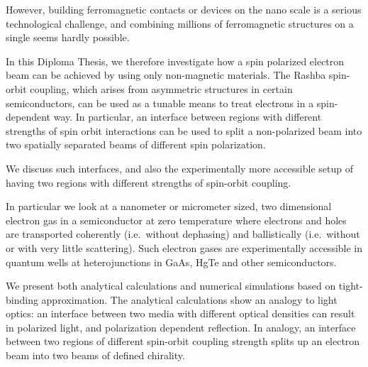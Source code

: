 However, building ferromagnetic contacts or devices on
the nano scale is a serious technological challenge, and combining millions of
ferromagnetic structures on a single seems hardly possible.

In this Diploma Thesis, we therefore investigate how a spin polarized electron
beam can be achieved by using only non-magnetic materials. The Rashba 
spin-orbit coupling, which arises from
asymmetric structures in certain semiconductors, can be used as a tunable
means to treat
electrons in a spin-dependent way. In particular, an interface
between regions with different strengths of spin orbit interactions can be
used to split a non-polarized beam into two spatially separated beams of
different spin polarization.

We discuss such interfaces, and also the experimentally more accessible setup
of having two regions with different strengths of spin-orbit coupling.

In particular we look at a nanometer or micrometer sized, two dimensional
electron gas in a semiconductor at zero temperature where electrons and holes
are transported coherently (i.e.~without dephasing) and ballistically
(i.e.~without or with very little scattering). Such electron gases are
experimentally accessible in quantum wells at heterojunctions in GaAs,
HgTe and other semiconductors.

We present both analytical calculations and numerical simulations based on
tight-binding approximation. The analytical calculations show an analogy to
light optics:  an interface between two media with different optical densities
can result in polarized light, and polarization dependent reflection. In
analogy, an interface between two regions of different spin-orbit coupling
strength splits up an electron beam into two beams of defined chirality.

